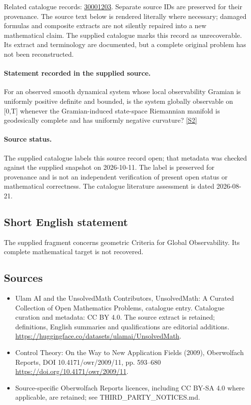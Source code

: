 \documentclass[11pt]{article}
\begin{document}
Related catalogue records: \href{https://mehmetmars7.github.io/Erdosproblems-llm-hunter/problem.html?type=open_problems&id=30001203}{30001203}. Separate source IDs are preserved for their provenance.
The source text below is rendered literally where necessary; damaged formulas and composite extracts are not silently repaired into a new mathematical claim.
The supplied catalogue marks this record as unrecoverable. Its extract and terminology are documented, but a complete original problem has not been reconstructed.
\paragraph{Statement recorded in the supplied source.}
For an observed smooth dynamical system whose local observability Gramian is uniformly positive definite and bounded, is the system globally observable on [0,T] whenever the Gramian-induced state-space Riemannian manifold is geodesically complete and has uniformly negative curvature? \href{https://doi.org/10.4171/owr/2009/11}{[S2]}
\paragraph{Source status.}
The supplied catalogue labels this source record open; that metadata was checked against the supplied snapshot on 2026-10-11. The label is preserved for provenance and is not an independent verification of present open status or mathematical correctness. The catalogue literature assessment is dated 2026-08-21.
\subsection{Short English statement}
The supplied fragment concerns geometric Criteria for Global Observability. Its complete mathematical target is not recovered.
\subsection{Sources}
\begin{itemize}
\item[S1] Ulam AI and the UnsolvedMath Contributors, UnsolvedMath: A Curated Collection of Open Mathematics Problems, catalogue entry. Catalogue curation and metadata: CC BY 4.0. The source extract is retained; definitions, English summaries and qualifications are editorial additions.
\url{https://huggingface.co/datasets/ulamai/UnsolvedMath}.
\item[S2] Control Theory: On the Way to New Application Fields (2009), Oberwolfach Reports, DOI 10.4171/owr/2009/11, pp. 593--680
\url{https://doi.org/10.4171/owr/2009/11}.
\item Source-specific Oberwolfach Reports licences, including CC BY-SA 4.0 where applicable, are retained; see THIRD\_PARTY\_NOTICES.md.
\end{itemize}
\end{document}
